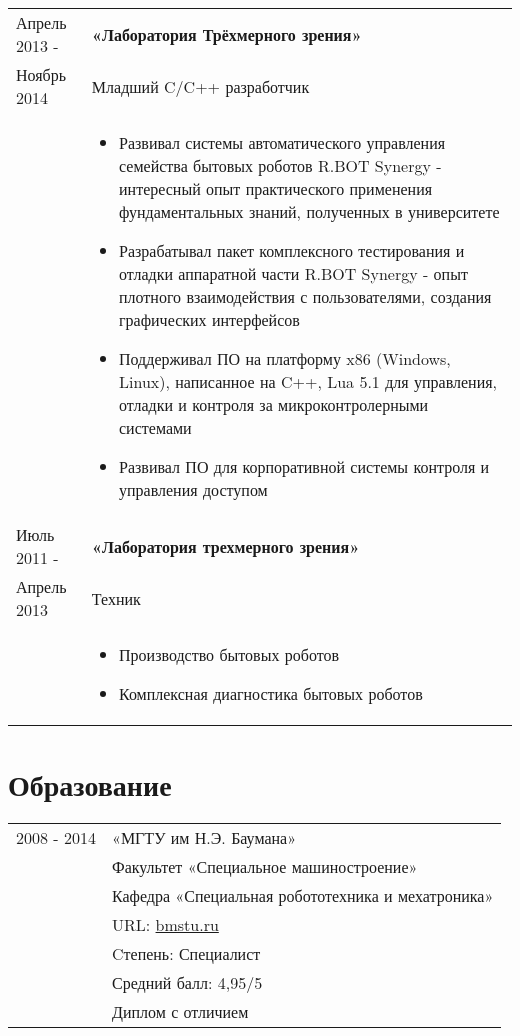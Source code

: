 \documentclass[a4paper, 11pt]{article}
\begin{document}
\begin{longtable}{p{25mm}|p{110mm}}
    \pagebreak[4]
    Апрель 2013 -       & \textbf{«Лаборатория Трёхмерного зрения»}                 \\
    Ноябрь 2014         & Младший C/C++ разработчик                                 \\
                        &
    \begin{itemize}
        \item   Развивал системы автоматического управления семейства бытовых
                роботов R.BOT Synergy - интересный опыт практического применения
                фундаментальных знаний, полученных в университете
        \item   Разрабатывал пакет комплексного тестирования и отладки аппаратной
                части R.BOT Synergy - опыт плотного взаимодействия с пользователями,
                создания графических интерфейсов
        \item   Поддерживал ПО на платформу x86 (Windows, Linux), написанное на
                C++, Lua 5.1 для управления, отладки и контроля за
                микроконтролерными системами
        \item   Развивал ПО для корпоративной системы контроля и управления
                доступом
    \end{itemize}                                                                   \\

    \pagebreak[3]
    Июль 2011 - & \textbf{«Лаборатория трехмерного зрения»}                         \\
    Апрель 2013 & Техник                                                            \\
                &
    \begin{itemize}
        \item   Производство бытовых роботов
        \item   Комплексная диагностика бытовых роботов
    \end{itemize}                                                                   \\
\end{longtable}

\section{Образование}
\begin{tabular}{p{25mm}|p{110mm}}
2008 - 2014         & «МГТУ им Н.Э. Баумана»                            \\
                    & Факультет «Специальное машиностроение»            \\
                    & Кафедра «Специальная робототехника и мехатроника» \\
                    & URL: \href{http://bmstu.ru}{bmstu.ru}             \\
                    & Cтепень: Специалист                               \\
                    & Средний балл: 4,95/5                              \\
                    & Диплом с отличием
\end{tabular}
\end{document}
